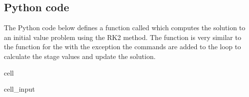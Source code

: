 \documentclass[letterpaper,10pt,english]{jupyterBook}
\begin{document}
\subsection{Python code}
\label{\detokenize{1_IVPs/1.4_RK2:python-code}}\label{\detokenize{1_IVPs/1.4_RK2:rk2-python-code}}
\sphinxAtStartPar
The Python code below defines a function called  which computes the solution to an initial value problem using the RK2 method. The function is very similar to the function for the {\hyperref[\detokenize{1_IVPs/1.2_Euler_Method:py-euler}]{}} with the exception the commands are added to the  loop to calculate the stage values and update the solution.

\begin{sphinxuseclass}{cell}\begin{sphinxVerbatimInput}

\begin{sphinxuseclass}{cell_input}
\begin{sphinxVerbatim}[commandchars=\\\{\}]
    
      \PYG{p}{[}\PYG{p}{]}  \PYG{p}{[}\PYG{p}{]}  
      
          
         
    \PYG{p}{[}\PYG{p}{]}  
       
          \PYG{p}{[}\PYG{p}{]} \PYG{p}{[}\PYG{p}{]}
          \PYG{p}{[}\PYG{p}{]}   \PYG{p}{[}\PYG{p}{]}    
        \PYG{p}{[}\PYG{p}{]}  \PYG{p}{[}\PYG{p}{]}        
        
      
\end{sphinxVerbatim}

\end{sphinxuseclass}\end{sphinxVerbatimInput}

\end{sphinxuseclass}
\end{document}

